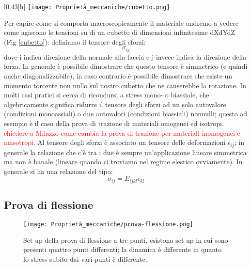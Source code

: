 \begin{wrapfigure}{l}{0.43\textwidth}[h]
  \centering
  \texttt{[image: Proprietà\_meccaniche/cubetto.png]}
  \caption{cubetto}
  \label{cubetto}
\end{wrapfigure}

Per capire come si comporta macroscopicamente il materiale andremo a vedere come agiscono le tensioni su di un cubetto di dimensioni infinitesime dXdYdZ (Fig \ref{cubetto}): definiamo il tensore degli sforzi: $$\sigma_{ij}$$ dove i indica direzione della normale alla faccia e j invece indica la direzione della forza.
In generale è possibile dimostrare che questo tensore è simmetrico (e quindi anche diagonalizzabile), in caso contrario è possibile dimostrare che esiste un momento torcente non nullo sul nostro cubetto che ne causerebbe la rotazione.
In molti casi pratici si cerca di ricondursi a stress mono- o biassiale, che algebricamente significa ridurre il tensore degli sforzi ad un solo autovalore (condizioni monoassiali) o due autovalori (condizioni biassiali) nonnulli; questo ad esempio è il caso della prova di trazione di materiali omogenei ed isotropi. \textcolor{red}{chiedere a Milazzo come cambia la prova di trazione per materiali inomogenei e anisotropi}. Al tensore degli sforzi è associato un tensore delle deformazioni $\epsilon_{ij}$; in generale la relazione che c'è tra i due è sempre un'applicazione lineare simmetrica ma non è banale (lineare quando ci troviamo nel regime elestico ovviamente). In generale si ha una relazione del tipo:
\begin{equation}
    \sigma_{ij}=E_{ijkl}\epsilon_{kl}
\end{equation}

\subsection{Prova di flessione}

\begin{figure}[h]
    \centering
    \texttt{[image: Proprietà\_meccaniche/prova-flessione.png]}
    \caption{Set up della prova di flessione a tre punti, esistono set up in cui sono presenti quattro punti differenti; la dinamica è differente in quanto lo stress subito dai vari punti è differente.}
    \label{fig:prova-flessione}
\end{figure}

